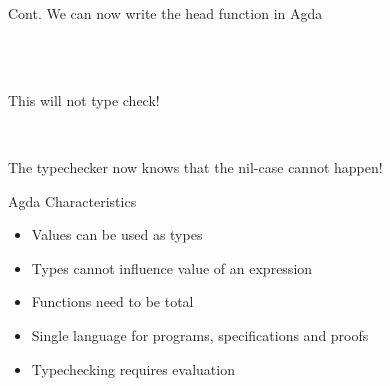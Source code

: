 \begin{frame}[fragile]{Cont.}
We can now write the head function in Agda
\begin{code}%
\> \AgdaSymbol{:}  \AgdaSymbol{\{} \AgdaSymbol{\}}      \<%
\\
\> \AgdaSymbol{(}  \AgdaSymbol{)} \AgdaSymbol{=} \<%
\\
\>  \AgdaSymbol{=} \<%
\end{code}
\pause
This will not type check!
\par
\pause
\vspace{0.5cm}
\begin{code}%
\> \AgdaSymbol{:}  \AgdaSymbol{\{} \AgdaSymbol{\}}    \AgdaSymbol{(} \AgdaSymbol{)}  \<%
\\
\> \AgdaSymbol{(}  \AgdaSymbol{)} \AgdaSymbol{=} \<%
\end{code}
The typechecker now knows that the nil-case cannot happen!
\end{frame}

\begin{frame}{Agda Characteristics}
\begin{itemize}
\item Values can be used as types
\item Types cannot influence value of an expression
\item Functions need to be total
\vspace{0.5cm}
\item Single language for programs, specifications and proofs
\item Typechecking requires evaluation
\end{itemize}
\end{frame}
